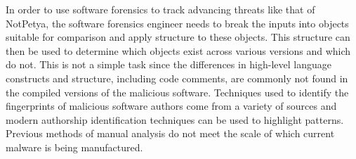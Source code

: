 \documentclass[12pt]{report}
\begin{document}

In order to use software forensics to track advancing threats like that of NotPetya, the software forensics engineer needs to break the inputs into objects suitable for comparison and apply structure to these objects.  This structure can then be used to determine which objects exist across various versions and which do not.  This is not a simple task since the differences in high-level language constructs and structure, including code comments, are commonly not found in the compiled versions of the malicious software.  Techniques used to identify the fingerprints of malicious software authors come from a variety of sources and modern authorship identification techniques can be used to highlight patterns.  Previous methods of manual analysis do not meet the scale of which current malware is being manufactured.
\end{document}
